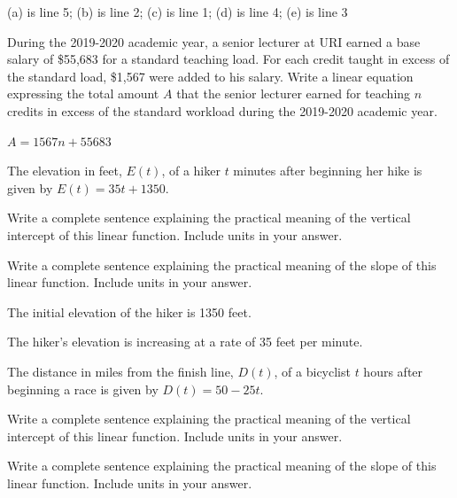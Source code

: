 \begin{solution}
    (a) is line 5; (b) is line 2; (c) is line 1; (d) is line 4; (e) is line 3
\end{solution}





\begin{exercise}
During the 2019-2020 academic year, a senior lecturer at URI earned a base salary of \$55,683 for a standard teaching load. For each credit taught in excess of the standard load, \$1,567 were added to his salary. Write a linear equation expressing the total amount $A$ that the senior lecturer earned for teaching $n$ credits in excess of the standard workload during the 2019-2020 academic year. 
\end{exercise}

\begin{solution}
$A=1567n+55683$
\end{solution}




\begin{exercise}
The elevation in feet, $E(t)$, of a hiker $t$ minutes after beginning her hike is given by $E(t)=35t+1350$.
\begin{parts}
\item Write a complete sentence explaining the practical meaning of the vertical intercept of this linear function. Include units in your answer.

\item Write a complete sentence explaining the practical meaning of the slope of this linear function. Include units in your answer.
\end{parts}
\end{exercise}


\begin{solution}
    \begin{parts}
        \item The initial elevation of the hiker is 1350 feet.
        \item The hiker's elevation is increasing at a rate of 35 feet per minute.
    \end{parts}
\end{solution}






\begin{exercise}
The distance in miles from the finish line, $D(t)$, of a bicyclist $t$ hours after beginning a race is given by $D(t)=50-25t$.
\begin{parts}
\item Write a complete sentence explaining the practical meaning of the vertical intercept of this linear function. Include units in your answer.
\item Write a complete sentence explaining the practical meaning of the slope of this linear function. Include units in your answer.
\end{parts}
\end{exercise}

